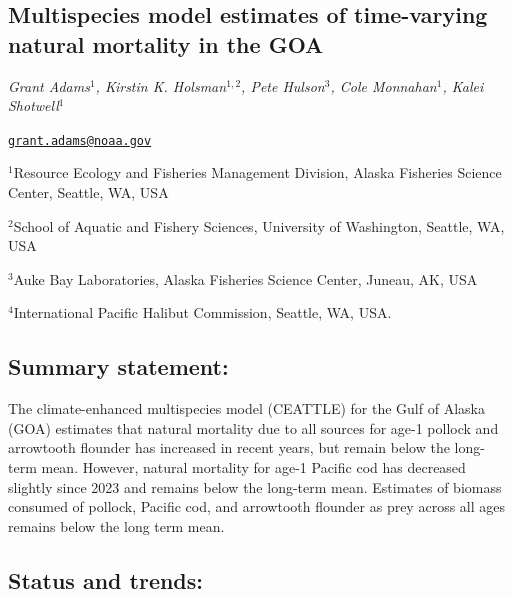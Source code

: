 \documentclass[
]{article}
\author{}
\date{\vspace{-2.5em}}
\begin{document}
\subsection{Multispecies model estimates of time-varying natural
mortality in the
GOA}\label{multispecies-model-estimates-of-time-varying-natural-mortality-in-the-goa}

\emph{Grant Adams\(^1\), Kirstin K. Holsman\(^{1,2}\), Pete
Hulson\(^3\), Cole Monnahan\(^1\), Kalei Shotwell\(^1\)}

\href{mailto:grant.adams@noaa.gov}{\nolinkurl{grant.adams@noaa.gov}}

\(^1\)Resource Ecology and Fisheries Management Division, Alaska
Fisheries Science Center, Seattle, WA, USA

\(^2\)School of Aquatic and Fishery Sciences, University of Washington,
Seattle, WA, USA

\(^3\)Auke Bay Laboratories, Alaska Fisheries Science Center, Juneau,
AK, USA

\(^4\)International Pacific Halibut Commission, Seattle, WA, USA.

\subsection{Summary statement:}\label{summary-statement}

The climate-enhanced multispecies model (CEATTLE) for the Gulf of Alaska
(GOA) estimates that natural mortality due to all sources for age-1
pollock and arrowtooth flounder has increased in recent years, but
remain below the long-term mean. However, natural mortality for age-1
Pacific cod has decreased slightly since 2023 and remains below the
long-term mean. Estimates of biomass consumed of pollock, Pacific cod,
and arrowtooth flounder as prey across all ages remains below the long
term mean.

\subsection{Status and trends:}\label{status-and-trends}
\end{document}
